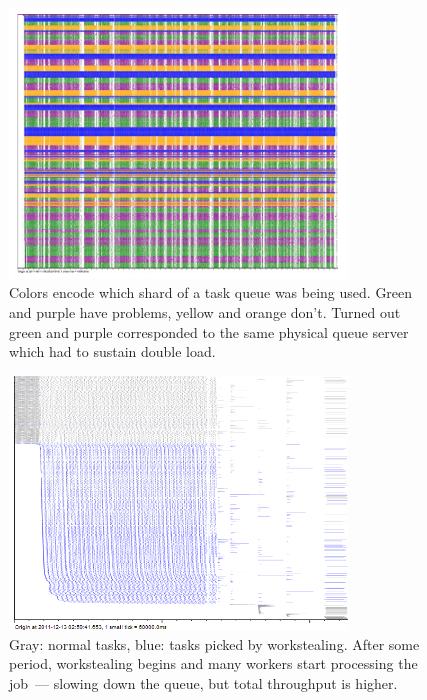 \documentclass{article}
\begin{document}
\begin{figure}[p]
\center
\includegraphics[width=0.8\textwidth]{pics/splot/rabbit-collision.png}
\caption{Colors encode which shard of a task queue was being used. Green and purple have problems, yellow and orange don't. Turned out green and purple corresponded to the same physical queue server which had to sustain double load.}
\end{figure}

\begin{figure}[p]
\center
\includegraphics[width=0.8\textwidth]{pics/splot/workstealing.png}
\caption{Gray: normal tasks, blue: tasks picked by workstealing. After some period, workstealing begins and many workers start processing the job~--- slowing down the queue, but total throughput is higher.}
\end{figure}
\end{document}
